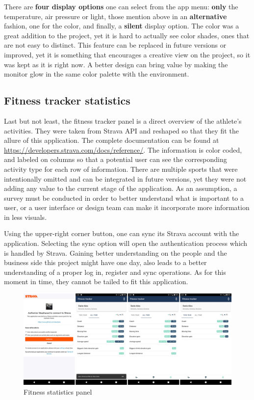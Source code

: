 There are \textbf{four display options} one can select from the app menu: \textbf{only} the temperature, air pressure or light, those mention above in an \textbf{alternative} fashion, one for the color, and finally, a \textbf{silent} display option. The color was a great addition to the project, yet it is hard to actually see color shades, ones that are not easy to distinct. This feature can be replaced in future versions or improved, yet it is something that encourages a creative view on the project, so it was kept as it is right now. A better design can bring value by making the monitor glow in the same color palette with the environment.

\subsection{Fitness tracker statistics}

Last but not least, the fitness tracker panel is a direct overview of the athlete's activities. They were taken from Strava API and reshaped so that they fit the allure of this application. The complete documentation can be found at \url{https://developers.strava.com/docs/reference/}. The information is color coded, and labeled on columns so that a potential user can see the corresponding activity type for each row of information. There are multiple sports that were intentionally omitted and can be integrated in future versions, yet they were not adding any value to the current stage of the application. As an assumption, a survey must be conducted in order to better understand what is important to a user, or a user interface or design team can make it incorporate more information in less visuals. 

Using the upper-right corner button, one can sync its Strava account with the application. Selecting the sync option will open the authentication process which is handled by Strava. Gaining better understanding on the people and the business side this project might have one day, also leads to a better understanding of a proper log in, register and sync operations. As for this moment in time, they cannot be tailed to fit this application.
\begin{figure}[!htb]
    \centering
    \includegraphics[width = 15.5cm]{figures/stats_panel}
    \caption{Fitness statistics panel}
    \label{fig:fitness_statistics_panel}
\end{figure}

